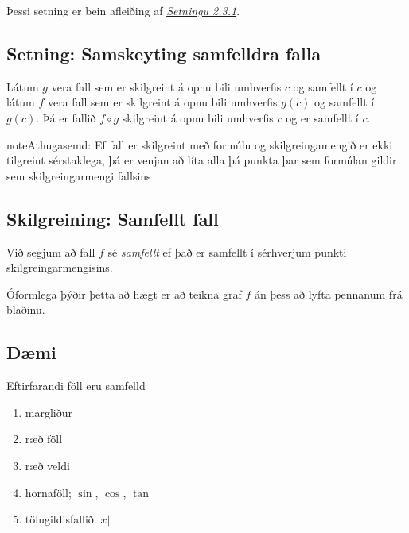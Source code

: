 \documentclass[a4paper,10pt,icelandic]{sphinxmanual}
\begin{document}
Þessi setning er bein afleiðing af {\hyperref[kafli02:setning\string-markgildi]{\emph{Setningu 2.3.1}}}.


\subsection{Setning: Samskeyting samfelldra falla}
\label{kafli02:setning-samskeyting-samfelldra-falla}
Látum \(g\) vera fall sem er skilgreint á opnu bili umhverfis
\(c\) og samfellt í \(c\) og látum \(f\) vera fall sem er
skilgreint á opnu bili umhverfis \(g(c)\) og samfellt í
\(g(c)\). Þá er fallið \(f\circ g\) skilgreint á opnu bili
umhverfis \(c\) og er samfellt í \(c\).

\begin{notice}{note}{Athugasemd:}
Ef fall er skilgreint með formúlu og skilgreingamengið er ekki tilgreint
sérstaklega, þá er venjan að líta alla þá punkta þar sem formúlan gildir
sem skilgreingarmengi fallsins
\end{notice}


\subsection{Skilgreining: Samfellt fall}
\label{kafli02:index-9}\label{kafli02:skilgreining-samfellt-fall}\label{kafli02:skilgrsamfellt}
Við segjum að fall \(f\) sé \textit{samfellt} ef það er samfellt í
sérhverjum punkti skilgreingarmengisins.

Óformlega þýðir þetta að hægt er að teikna graf \(f\) án þess að lyfta pennanum frá blaðinu.


\subsection{Dæmi}
\label{kafli02:id13}
Eftirfarandi föll eru samfelld
\begin{enumerate}
\item {} 
margliður

\item {} 
ræð föll

\item {} 
ræð veldi

\item {} 
hornaföll; \(\sin\), \(\cos\), \(\tan\)

\item {} 
tölugildisfallið \(|x|\)

\end{enumerate}
\end{document}
